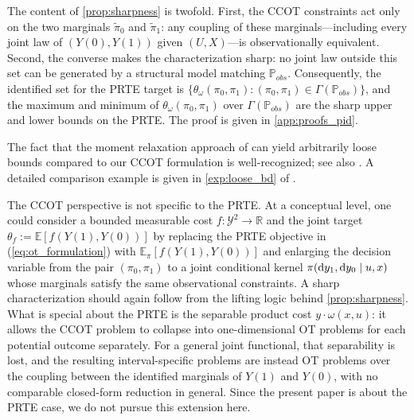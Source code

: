 The content of \cref{prop:sharpness} is twofold. First, the CCOT constraints act only on the two marginals $\tilde{\pi}_0$ and $\tilde{\pi}_1$: any coupling of these marginals---including every joint law of $(Y(0), Y(1))$ given $(U, X)$---is observationally equivalent. Second, the converse makes the characterization sharp: no joint law outside this set can be generated by a structural model matching $\mathbb{P}_{obs}$. Consequently, the identified set for the PRTE target is $\{\theta_\omega(\pi_0, \pi_1) : (\pi_0, \pi_1) \in \Gamma(\mathbb{P}_{obs})\}$, and the maximum and minimum of $\theta_\omega(\pi_0, \pi_1)$ over $\Gamma(\mathbb{P}_{obs})$ are the sharp upper and lower bounds on the PRTE. The proof is given in \cref{app:proofs_pid}.

\begin{remark}
The fact that the moment relaxation approach of \citet{magne2018using} can yield arbitrarily loose bounds compared to our CCOT formulation is well-recognized; see also \citet{han_yang2024computational}. A detailed comparison example is given in \cref{exp:loose_bd} of \oalocation.
\end{remark}

\begin{remark}\label{rem:general_functional}
The CCOT perspective is not specific to the PRTE. At a conceptual level, one could consider a bounded measurable cost $f:\mathcal{Y}^2 \to \mathbb{R}$ and the joint target $\theta_f := \mathbb{E}[f(Y(1),Y(0))]$ by replacing the PRTE objective in (\ref{eq:ot_formulation}) with $\mathbb{E}_{\pi}[f(Y(1),Y(0))]$ and enlarging the decision variable from the pair $(\pi_0,\pi_1)$ to a joint conditional kernel $\pi({\rm d} y_1,{\rm d} y_0 \mid u,x)$ whose marginals satisfy the same observational constraints. A sharp characterization should again follow from the lifting logic behind \cref{prop:sharpness}. What is special about the PRTE is the separable product cost $y \cdot \omega(x,u)$: it allows the CCOT problem to collapse into one-dimensional OT problems for each potential outcome separately. For a general joint functional, that separability is lost, and the resulting interval-specific problems are instead OT problems over the coupling between the identified marginals of $Y(1)$ and $Y(0)$, with no comparable closed-form reduction in general. Since the present paper is about the PRTE case, we do not pursue this extension here.
\end{remark}



